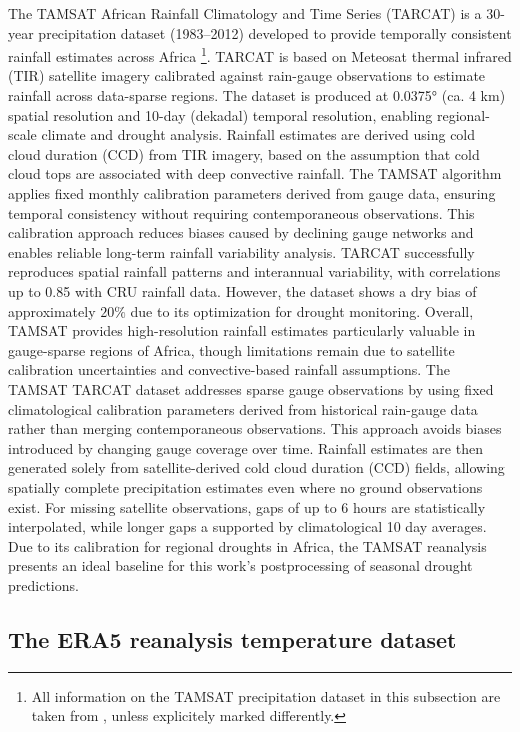 \documentclass[ba-lentz.tex]{subfile}
\begin{document}
The TAMSAT African Rainfall Climatology and Time Series (TARCAT) is a 30-year precipitation dataset (1983–2012) developed to provide temporally consistent rainfall estimates across Africa \parencite{maidment_tamsat_2020}\footnote{All information on the TAMSAT precipitation dataset in this subsection are taken from \parencite{maidment_tamsat_2020}, unless explicitely marked differently.}.
TARCAT is based on Meteosat thermal infrared (TIR) satellite imagery calibrated against rain-gauge observations to estimate rainfall across data-sparse regions.
The dataset is produced at 0.0375° (ca. 4 km) spatial resolution and 10-day (dekadal) temporal resolution, enabling regional-scale climate and drought analysis.
Rainfall estimates are derived using cold cloud duration (CCD) from TIR imagery, based on the assumption that cold cloud tops are associated with deep convective rainfall.
The TAMSAT algorithm applies fixed monthly calibration parameters derived from gauge data, ensuring temporal consistency without requiring contemporaneous observations.
This calibration approach reduces biases caused by declining gauge networks and enables reliable long-term rainfall variability analysis.
TARCAT successfully reproduces spatial rainfall patterns and interannual variability, with correlations up to 0.85 with CRU rainfall data.
However, the dataset shows a dry bias of approximately $20 \%$ due to its optimization for drought monitoring.
Overall, TAMSAT provides high-resolution rainfall estimates particularly valuable in gauge-sparse regions of Africa, though limitations remain due to satellite calibration uncertainties and convective-based rainfall assumptions.
The TAMSAT TARCAT dataset addresses sparse gauge observations by using fixed climatological calibration parameters derived from historical rain-gauge data rather than merging contemporaneous observations.
This approach avoids biases introduced by changing gauge coverage over time.
Rainfall estimates are then generated solely from satellite-derived cold cloud duration (CCD) fields, allowing spatially complete precipitation estimates even where no ground observations exist.
For missing satellite observations, gaps of up to 6 hours are statistically interpolated, while longer gaps a supported by climatological 10 day averages.
Due to its calibration for regional droughts in Africa, the TAMSAT reanalysis presents an ideal baseline for this work's postprocessing of seasonal drought predictions.

\subsection{The ERA5 reanalysis temperature dataset}\label{era5}
\end{document}
